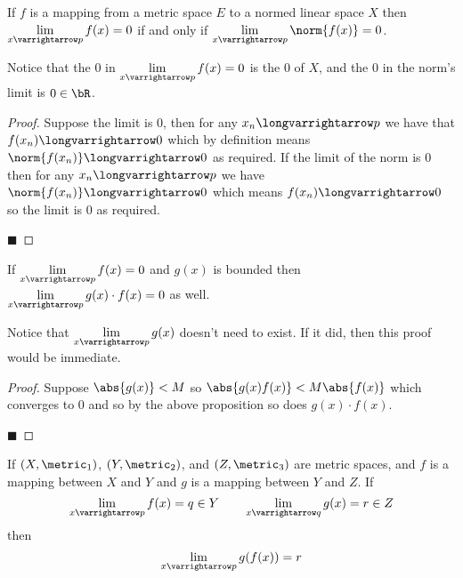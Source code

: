 \documentclass[10pt]{article}
\let\ds=\displaystyle
\begin{document}
\begin{prop*}

    If $f$ is a mapping from a metric space $E$ to a normed linear space $X$ then $\ds\lim_{x\varrightarrow p}f(x)=0$ if and only if $\ds\lim_{x\varrightarrow p}\norm{f(x)}=0$.

\end{prop*}

Notice that the $0$ in $\ds\lim_{x\varrightarrow p}f(x)=0$ is the $0$ of $X$, and the $0$ in the norm's limit is $0\in\bR$.

\begin{proof}

    Suppose the limit is $0$, then for any $x_n\longvarrightarrow p$ we have that $f(x_n)\longvarrightarrow0$ which by definition means $\norm{f(x_n)}\longvarrightarrow0$ as required.
    If the limit of the norm is $0$ then for any $x_n\longvarrightarrow p$ we have $\norm{f(x_n)}\longvarrightarrow0$ which means $f(x_n)\longvarrightarrow0$ so the limit is $0$ as required.

    \hfill$\blacksquare$

\end{proof}

\begin{prop*}

    If $\ds\lim_{x\varrightarrow p}f(x)=0$ and $g(x)$ is bounded then $\ds\lim_{x\varrightarrow p}g(x)\cdot f(x)=0$ as well.

\end{prop*}

Notice that $\ds\lim_{x\varrightarrow p}g(x)$ doesn't need to exist.
If it did, then this proof would be immediate.

\begin{proof}

    Suppose $\abs{g(x)}<M$ so $\abs{g(x)f(x)}<M\abs{f(x)}$ which converges to $0$ and so by the above proposition so does $g(x)\cdot f(x)$.
   
    \hfill$\blacksquare$

\end{proof}

\begin{thrm*}

    If $(X,\metric_1)$, $(Y,\metric_2)$, and $(Z,\metric_3)$ are metric spaces, and $f$ is a mapping between $X$ and $Y$ and $g$ is a mapping between $Y$ and $Z$.
    If
    \[ \lim_{x\varrightarrow p}f(x) = q \in Y \qquad \lim_{x\varrightarrow q}g(x) = r \in Z \]
    then
    \[ \lim_{x\varrightarrow p} g(f(x)) = r \]

\end{thrm*}
\end{document}
